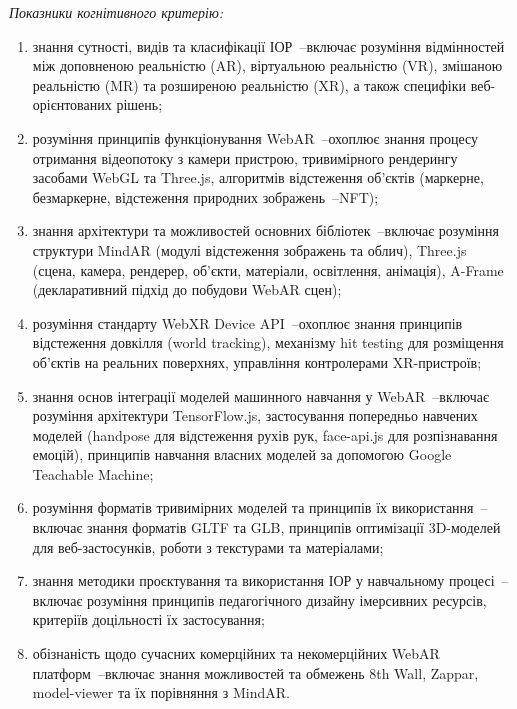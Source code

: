 \textit{Показники когнітивного критерію:}
\begin{enumerate}
\item знання сутності, видів та класифікації ІОР~--включає розуміння відмінностей між доповненою реальністю (AR), віртуальною реальністю (VR), змішаною реальністю (MR) та розширеною реальністю (XR), а також специфіки веб-орієнтованих рішень;
\item розуміння принципів функціонування WebAR~--охоплює знання процесу отримання відеопотоку з камери пристрою, тривимірного рендерингу засобами WebGL та Three.js, алгоритмів відстеження об'єктів (маркерне, безмаркерне, відстеження природних зображень~--NFT);
\item знання архітектури та можливостей основних бібліотек~--включає розуміння структури MindAR (модулі відстеження зображень та облич), Three.js (сцена, камера, рендерер, об'єкти, матеріали, освітлення, анімація), A-Frame (декларативний підхід до побудови WebAR сцен);
\item розуміння стандарту WebXR Device API~--охоплює знання принципів відстеження довкілля (world tracking), механізму hit testing для розміщення об'єктів на реальних поверхнях, управління контролерами XR-пристроїв;
\item знання основ інтеграції моделей машинного навчання у WebAR~--включає розуміння архітектури TensorFlow.js, застосування попередньо навчених моделей (handpose для відстеження рухів рук, face-api.js для розпізнавання емоцій), принципів навчання власних моделей за допомогою Google Teachable Machine;
\item розуміння форматів тривимірних моделей та принципів їх використання~--включає знання форматів GLTF та GLB, принципів оптимізації 3D-моделей для веб-застосунків, роботи з текстурами та матеріалами;
\item знання методики проєктування та використання ІОР у навчальному процесі~--включає розуміння принципів педагогічного дизайну імерсивних ресурсів, критеріїв доцільності їх застосування;
\item обізнаність щодо сучасних комерційних та некомерційних WebAR платформ~--включає знання можливостей та обмежень 8th Wall, Zappar, model-viewer та їх порівняння з MindAR.
\end{enumerate}


